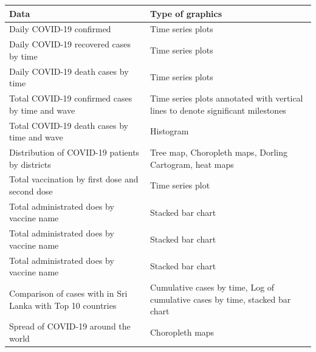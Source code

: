 \documentclass[
]{article}
\begin{document}
\begin{longtable}[]{@{}
  >{\raggedright\arraybackslash}p{}
  >{\raggedright\arraybackslash}p{}@{}}
\toprule
\textbf{Data} & \textbf{Type of graphics} \\
\midrule
\endhead
Daily COVID-19 confirmed & Time series plots \hfill\break \\
Daily COVID-19 recovered cases by time & Time series plots
\hfill\break \\
Daily COVID-19 death cases by time & Time series plots \hfill\break \\
Total COVID-19 confirmed cases by time and wave & Time series plots
annotated with vertical lines to denote significant milestones
\hfill\break \\
Total COVID-19 death cases by time and wave & Histogram \hfill\break \\
Distribution of COVID-19 patients by districts & Tree map, Choropleth
maps, Dorling Cartogram, heat maps \hfill\break \\
Total vaccination by first dose and second dose & Time series plot
\hfill\break \\
Total administrated does by vaccine name & Stacked bar chart
\hfill\break \\
Total administrated does by vaccine name & Stacked bar chart
\hfill\break \\
Total administrated does by vaccine name & Stacked bar chart
\hfill\break \\
Comparison of cases with in Sri Lanka with Top 10 countries & Cumulative
cases by time, Log of cumulative cases by time, stacked bar chart
\hfill\break \\
Spread of COVID-19 around the world & Choropleth maps \hfill\break \\
\bottomrule
\end{longtable}
\end{document}
